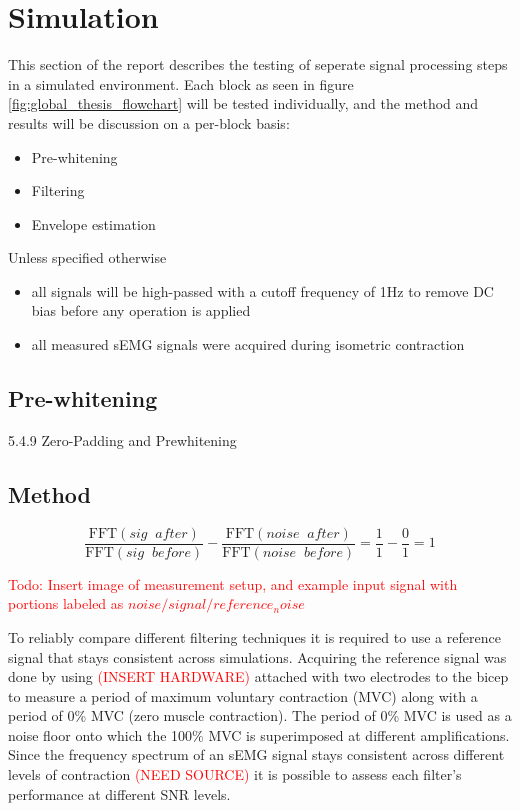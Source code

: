 \chapter{Simulation}
This section of the report describes the testing of seperate signal processing steps in a simulated environment. Each block as seen in figure \ref{fig:global_thesis_flowchart} will be tested individually, and the method and results will be discussion on a per-block basis:
\begin{itemize}
    \item Pre-whitening
    \item Filtering
    \item Envelope estimation
\end{itemize}

Unless specified otherwise
\begin{itemize}
    \item all signals will be high-passed with a cutoff frequency of 1Hz to remove DC bias before any operation is applied
    \item all measured sEMG signals were acquired during isometric contraction
\end{itemize}

\section{Pre-whitening}
\cite{time_series_analysis_methods}


5.4.9 Zero-Padding and Prewhitening










\section{Method}

\begin{equation}
    \frac{\text{FFT}(sig \;\; after)}{\text{FFT}(sig \;\;  before)} - \frac{\text{FFT}(noise \;\;  after)}{\text{FFT}(noise \;\;  before)} = \frac{1}{1} - \frac{0}{1} = 1
\end{equation}

\textcolor{red}{Todo: Insert image of measurement setup, and example input signal with portions labeled as $noise/signal/reference_noise$}


To reliably compare different filtering techniques it is required to use a reference signal that stays consistent across simulations. Acquiring the reference signal was done by using \textcolor{red}{(INSERT HARDWARE)} attached with two electrodes to the bicep to measure a period of maximum voluntary contraction (MVC) along with a period of 0\% MVC (zero muscle contraction). The period of 0\% MVC is used as a noise floor onto which the 100\% MVC is superimposed at different amplifications. Since the frequency spectrum of an sEMG signal stays consistent across different levels of contraction \textcolor{red}{(NEED SOURCE)} it is possible to assess each filter's performance at different SNR levels.

